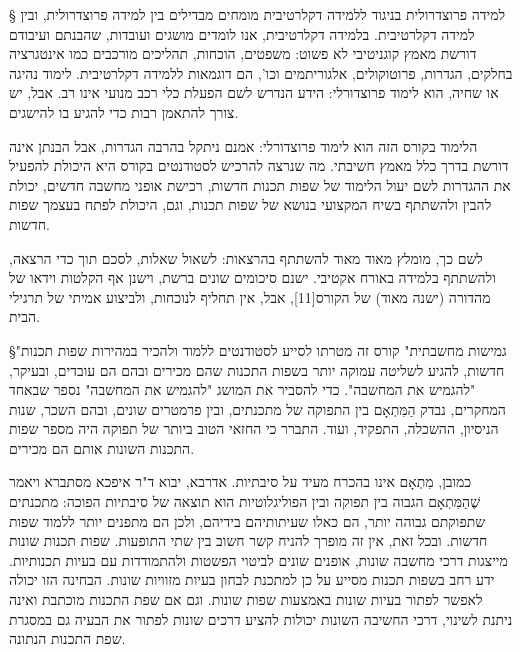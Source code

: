 § למידה פרוצדרולית בניגוד ללמידה דקלרטיבית 
מומחים מבדילים בין למידה פרוצדרולית, ובין למידה דקלרטיבית. בלמידה דקלרטיבית,
אנו לומדים מושגים ועובדות, שהבנתם ועיבודם דורשת מאמץ קוגניטיבי לא פשוט: משפטים,
הוכחות, תהליכים מורכבים כמו אינטגרציה בחלקים, הגדרות, פרוטוקולים, אלגוריתמים
וכו', הם דוגמאות ללמידה דקלרטיבית. לימוד נהיגה או שחיה, הוא לימוד פרוצדורלי:
הידע הנדרש לשם הפעלת כלי רכב מנועי אינו רב. אבל, יש צורך להתאמן רבות כדי להגיע
בו להישגים.

הלימוד בקורס הזה הוא לימוד פרוצדורלי: אמנם ניתקל בהרבה הגדרות, אבל הבנתן אינה
דורשת בדרך כלל מאמץ חשיבתי. מה שנרצה להרכיש לסטודנטים בקורס היא היכולת להפעיל
את ההגדרות לשם יעול הלימוד של שפות תכנות חדשות, רכישת אופני מחשבה חדשים, יכולת
להבין ולהשתתף בשיח המקצועי בנושא של שפות תכנות, וגם, היכולת לפתח בעצמך שפות
חדשות. 

לשם כך, מומלץ מאוד מאוד להשתתף בהרצאות: לשאול שאלות, לסכם תוך כדי הרצאה,
ולהשתתף בלמידה באורח אקטיבי. ישנם סיכומים שונים ברשת, וישנן אף הקלטות וידאו של
מהדורה (ישנה מאוד) של הקורס[11], אבל, אין תחליף לנוכחות, ולביצוע אמיתי של
תרגילי הבית. 

§"גמישות מחשבתית"
קורס זה מטרתו לסייע לסטודנטים ללמוד ולהכיר במהירות שפות תכנות חדשות, להגיע
לשליטה עמוקה יותר בשפות התכנות שהם מכירים ובהם הם עובדים, ובעיקר, "להגמיש את
המחשבה". כדי להסביר את המושג "להגמיש את המחשבה" נספר שבאחד המחקרים, נבדק הַמִּתְאָם
בין התפוקה של מתכנתים, ובין פרמטרים שונים, ובהם השכר, שנות הניסיון, ההשכלה,
התפקיד, ועוד. התברר כי החזאי הטוב ביותר של תפוקה היה מספר שפות התכנות השונות
אותם הם מכירים. 

כמובן, מִתְאָם אינו בהכרח מעיד על סיבתיות. אדרבא, יבוא ד"ר איפכא מסתברא ויאמר
שֶׁהַמִּתְאָם הגבוה בין תפוקה ובין הפוליגלוטיות הוא תוצאה של סיבתיות הפוכה: מתכנתים
שתפוקתם גבוהה יותר, הם כאלו שעיתותיהם בידיהם, ולכן הם מתפנים יותר ללמוד שפות
חדשות. ובכל זאת, אין זה מופרך להניח קשר חשוב בין שתי התופעות. שפות תכנות שונות
מייצגות דרכי מחשבה שונות, אופנים שונים לביטוי הפשטות ולהתמודדות עם בעיות
תכנותיות. ידע רחב בשפות תכנות מסייע על כן למתכנת לבחון בעיות מזוויות שונות.
הבחינה הזו יכולה לאפשר לפתור בעיות שונות באמצעות שפות שונות. וגם אם שפת התכנות
מוכתבת ואינה ניתנת לשינוי, דרכי החשיבה השונות יכולות להציע דרכים שונות לפתור את
הבעיה גם במסגרת שפת התכנות הנתונה.


